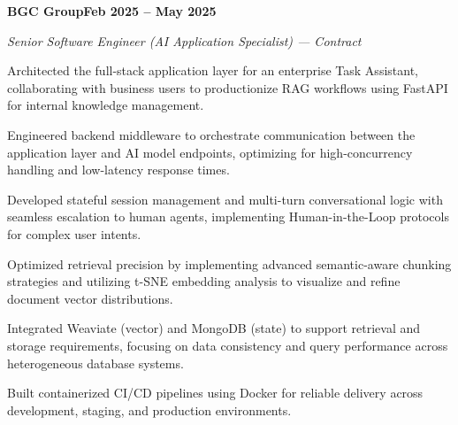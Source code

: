 \documentclass[letterpaper,10pt]{article}
\newcommand{\headingBf}[2]{\par\noindent\hspace*{10pt}\textbf{#1}\hfill\textbf{#2}}
\newcommand{\headingIt}[2]{\par\noindent\hspace*{10pt}\textit{#1}\hfill\textit{#2}}
\newenvironment{resume_list}{\vspace{-7pt}\begin{itemize}[itemsep=-2px, parsep=1pt, leftmargin=30pt]}{\end{itemize}}
\begin{document}
  \headingBf{BGC Group}{Feb 2025 -- May 2025}
  \headingIt{Senior Software Engineer (AI Application Specialist) --- Contract}{}
  \begin{resume_list}
    \item Architected the full-stack application layer for an enterprise Task Assistant, collaborating with business users to productionize RAG workflows using FastAPI for internal knowledge management.
    \item Engineered backend middleware to orchestrate communication between the application layer and AI model endpoints, optimizing for high-concurrency handling and low-latency response times.
    \item Developed stateful session management and multi-turn conversational logic with seamless escalation to human agents, implementing Human-in-the-Loop protocols for complex user intents.
    \item Optimized retrieval precision by implementing advanced semantic-aware chunking strategies and utilizing t-SNE embedding analysis to visualize and refine document vector distributions.
    \item Integrated Weaviate (vector) and MongoDB (state) to support retrieval and storage requirements, focusing on data consistency and query performance across heterogeneous database systems.
    \item Built containerized CI/CD pipelines using Docker for reliable delivery across development, staging, and production environments.
  \end{resume_list}
\end{document}
